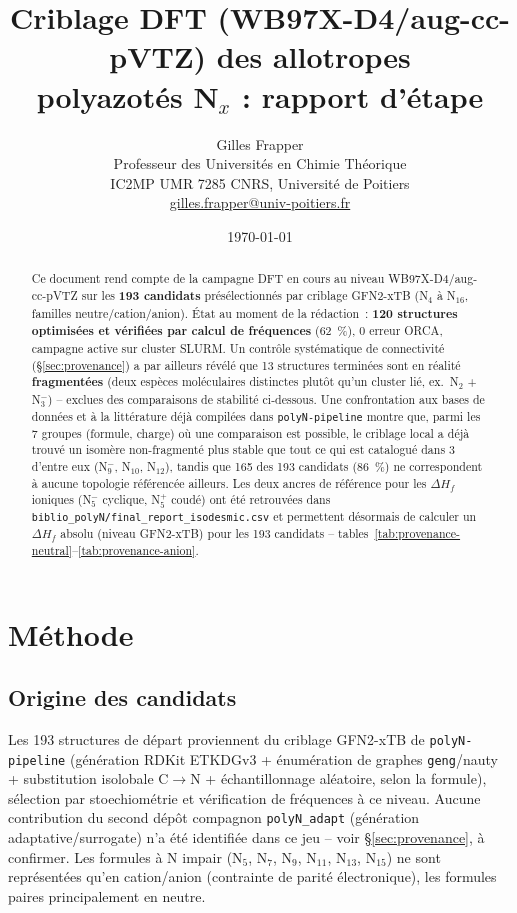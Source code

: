 \documentclass[11pt,a4paper]{article}
\title{\color{accent}\textbf{Criblage DFT (WB97X-D4/aug-cc-pVTZ) des allotropes\\
polyazot\'es N$_x$ : rapport d'\'etape}}
\author{Gilles Frapper \\ Professeur des Universit\'es en Chimie Th\'eorique \\ IC2MP UMR 7285 CNRS, Universit\'e de Poitiers \\[2pt] \small \href{mailto:gilles.frapper@univ-poitiers.fr}{gilles.frapper@univ-poitiers.fr}}
\date{\today}
\begin{document}
\maketitle
\thispagestyle{fancy}

\begin{abstract}
\noindent Ce document rend compte de la campagne DFT en cours au niveau
WB97X-D4/aug-cc-pVTZ sur les \textbf{193 candidats} pr\'es\'electionn\'es
par criblage GFN2-xTB (N$_4$ \`a N$_{16}$, familles neutre/cation/anion).
\'Etat au moment de la r\'edaction~: \textbf{120 structures optimis\'ees et
v\'erifi\'ees par calcul de fr\'equences} (62~\%), 0 erreur ORCA, campagne
active sur cluster SLURM. Un contr\^ole syst\'ematique de connectivit\'e
(\S\ref{sec:provenance}) a par ailleurs r\'ev\'el\'e que 13 structures
termin\'ees sont en r\'ealit\'e \textbf{fragment\'ees} (deux esp\`eces
mol\'eculaires distinctes plut\^ot qu'un cluster li\'e, ex.\ N$_2$ +
N$_3^-$) -- exclues des comparaisons de stabilit\'e ci-dessous. Une
confrontation aux bases de donn\'ees et \`a la litt\'erature d\'ej\`a
compil\'ees dans \texttt{polyN-pipeline} montre que, parmi les 7 groupes
(formule, charge) o\`u une comparaison est possible, le criblage local a
d\'ej\`a trouv\'e un isom\`ere non-fragment\'e plus stable que tout ce qui
est catalogu\'e dans 3 d'entre eux (N$_9^-$, N$_{10}$, N$_{12}$), tandis
que 165 des 193 candidats (86~\%) ne correspondent \`a aucune topologie
r\'ef\'erenc\'ee ailleurs. Les deux
ancres de r\'ef\'erence pour les $\Delta H_f$ ioniques (N$_5^-$ cyclique,
N$_5^+$ coud\'e) ont \'et\'e retrouv\'ees dans
\texttt{biblio\_polyN/final\_report\_isodesmic.csv} et permettent
d\'esormais de calculer un $\Delta H_f$ absolu (niveau GFN2-xTB) pour les
193 candidats -- tables~\ref{tab:provenance-neutral}--\ref{tab:provenance-anion}.
\end{abstract}

\tableofcontents

\section{M\'ethode}

\subsection{Origine des candidats}

Les 193 structures de d\'epart proviennent du criblage GFN2-xTB de
\texttt{polyN-pipeline} (g\'en\'eration RDKit ETKDGv3 + \'enum\'eration de
graphes \texttt{geng}/nauty + substitution isolobale C$\to$N +
\'echantillonnage al\'eatoire, selon la formule), s\'election par
stoechiom\'etrie et v\'erification de fr\'equences \`a ce niveau. Aucune
contribution du second d\'ep\^ot compagnon \texttt{polyN\_adapt}
(g\'en\'eration adaptative/surrogate) n'a \'et\'e identifi\'ee dans ce
jeu -- voir \S\ref{sec:provenance}, \`a confirmer.
Les formules \`a N impair (N$_5$, N$_7$, N$_9$, N$_{11}$, N$_{13}$,
N$_{15}$) ne sont repr\'esent\'ees qu'en cation/anion (contrainte de
parit\'e \'electronique), les formules paires principalement en neutre.
\end{document}

